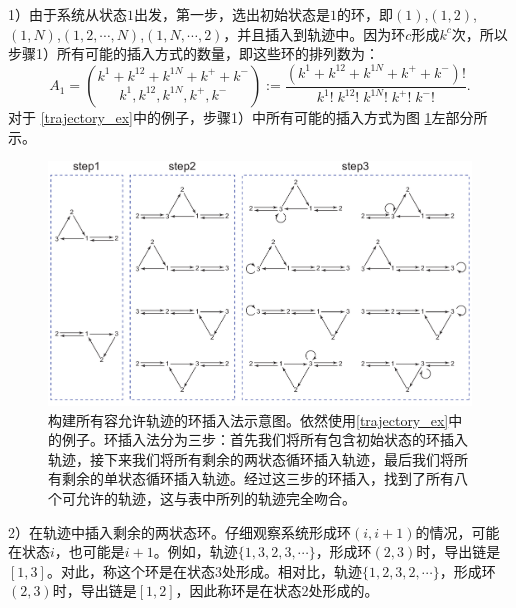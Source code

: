 1）由于系统从状态$1$出发，第一步，选出初始状态是$1$的环，即$(1)$,$(1,2)$,$(1,N)$,$(1,2,\cdots,N)$,$(1,N,\cdots,2)$，并且插入到轨迹中。因为环$c$形成$k^c$次，所以步骤1）所有可能的插入方式的数量，即这些环的排列数为：
\begin{equation*}\label{formula:A1}
    A_1 = \binom{k^1+k^{12}+k^{1N}+k^{+}+k^{-}}{k^1,k^{12},k^{1N},k^{+},k^{-}}
    := \frac{(k^1+k^{12}+k^{1N}+k^{+}+k^{-})!}{k^1!\;k^{12}!\;k^{1N}!\;k^{+}!\;k^{-}!}.
\end{equation*}
对于 \ref{trajectory_ex}中的例子，步骤1）中所有可能的插入方式为图 \ref{figure:insertion}左部分所示。
\begin{figure}[htb!]
\centering
\includegraphics[scale=0.6]{chart/insertiongraph.pdf}
\caption{构建所有容允许轨迹的环插入法示意图。依然使用\ref{trajectory_ex}中的例子。环插入法分为三步：首先我们将所有包含初始状态的环插入轨迹，接下来我们将所有剩余的两状态循环插入轨迹，最后我们将所有剩余的单状态循环插入轨迹。经过这三步的环插入，找到了所有八个可允许的轨迹，这与表中所列的轨迹完全吻合。}
\label{figure:insertion}
\end{figure}

2）在轨迹中插入剩余的两状态环。仔细观察系统形成环$(i,i+1)$的情况，可能在状态$i$，也可能是$i+1$。例如，轨迹$\{1, 3, 2, 3, \cdots\}$，形成环$(2,3)$时，导出链是$[1, 3]$。对此，称这个环是在状态$3$处形成。相对比，轨迹$\{1,2,3,2, \cdots\}$，形成环$(2,3)$时，导出链是$[1, 2]$，因此称环是在状态$2$处形成的。

